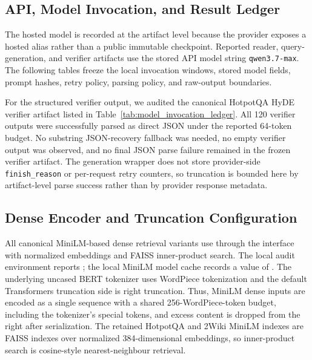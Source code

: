 \documentclass[10pt]{article}
\begin{document}
\subsection{API, Model Invocation, and Result Ledger}

The hosted model is recorded at the artifact level because the provider exposes a hosted alias rather than a public immutable checkpoint. Reported reader, query-generation, and verifier artifacts use the stored API model string \texttt{qwen3.7-max}. The following tables freeze the local invocation windows, stored model fields, prompt hashes, retry policy, parsing policy, and raw-output boundaries.




For the structured verifier output, we audited the canonical HotpotQA HyDE verifier artifact
listed in Table~\ref{tab:model_invocation_ledger}.
All 120 verifier outputs were successfully parsed as direct JSON under the reported 64-token
budget. No substring JSON-recovery fallback was needed, no empty verifier output was observed,
and no final JSON parse failure remained in the frozen verifier artifact. The generation wrapper
does not store provider-side \texttt{finish\_reason} or per-request retry counters, so truncation
is bounded here by artifact-level parse success rather than by provider response metadata.

\subsection{Dense Encoder and Truncation Configuration}
\label{sec:supp_dense_encoder_truncation}

All canonical MiniLM-based dense retrieval variants use  through the  interface with normalized embeddings and FAISS inner-product search. The local audit environment reports ; the local MiniLM model cache records a  value of . The underlying uncased BERT tokenizer uses WordPiece tokenization and the default Transformers truncation side is right truncation. Thus, MiniLM dense inputs are encoded as a single sequence with a shared 256-WordPiece-token budget, including the tokenizer's special tokens, and excess content is dropped from the right after serialization. The retained HotpotQA and 2Wiki MiniLM indexes are FAISS  indexes over normalized 384-dimensional embeddings, so inner-product search is cosine-style nearest-neighbour retrieval.
\end{document}
